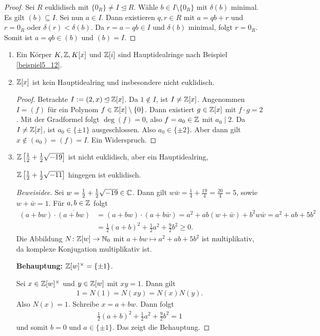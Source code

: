 \begin{proof}
	Sei $R$ euklidisch mit $\{0_R\} \neq I \unlhd R$. Wähle $b \in I \setminus \{0_R\}$ mit $\delta(b)$ minimal. Es gilt $(b) \subseteq I$. Sei nun $a \in I$. Dann existieren $q,r \in R$ mit $a = qb + r$ und $r = 0_R$ oder $\delta(r) < \delta(b)$. Da $r = a - qb \in I$ und $\delta(b)$ minimal, folgt  $r = 0_R$. Somit ist $a = qb \in (b)$ und $(b) = I$.
\end{proof}
\begin{beispiel}\label{beispiel5_15}
	\begin{enumerate}[label=(\arabic*)]
		\item Ein Körper $K, \mathbb{Z}, K[x]$ und $\mathbb{Z}[i]$ sind Hauptidealringe nach Beispiel \ref{beispiel5_12}.
		\item $\mathbb{Z}[x]$ ist kein Hauptidealring und insbesondere nicht euklidisch. 
		\begin{proof}
			Betrachte $I := (2,x) \unlhd \mathbb{Z}[x]$. Da $1 \notin I$, ist $I \neq \mathbb{Z}[x]$. Angenommen $I = (f)$ für ein Polynom $f \in \mathbb{Z}[x] \setminus \{0\}$. Dann existiert $g \in \mathbb{Z}[x]$ mit $f \cdot g = 2$. Mit der Gradformel folgt $\deg(f) = 0$, also $f = a_0 \in \mathbb{Z}$ mit $a_0 \mid 2$. Da $I \neq \mathbb{Z}[x]$, ist $a_0 \in \{\pm 1\}$ ausgeschlossen. Also $a_0 \in \{\pm 2\}$. Aber dann gilt $x \notin (a_0) = (f) = I$. Ein Widerspruch.
		\end{proof}
		\item $\mathbb{Z}\left[\frac{1}{2} + \frac{1}{2}\sqrt{-19}\right]$ ist nicht euklidisch, aber ein Hauptidealring,
		
		$\mathbb{Z}\left[\frac{1}{2} + \frac{1}{2}\sqrt{-11}\right]$ hingegen ist euklidisch.
		\begin{proof}[Beweisidee]
			Sei $w = \frac{1}{2} + \frac{1}{2}\sqrt{-19} \in \mathbb{C}$. Dann gilt $w \bar{w} = \frac{1}{4} + \frac{19}{4} = \frac{20}{4} = 5$, sowie $w + \bar{w} = 1$. Für $a,b \in \mathbb{Z}$ folgt
			\begin{align*}
				(a+bw) \cdot \overline{(a+bw)} &= (a+bw)\cdot(a+b\bar{w}) = a^2 + ab(w+\bar{w}) + b^2 w\bar{w} = a^2 + ab + 5b^2\\
				&= \frac{1}{2}(a+b)^2 + \frac{1}{2}a^2 + \frac{9}{2} b^2 \geq 0.
			\end{align*}
			Die Abbildung $N \colon \mathbb{Z}[w] \to \mathbb{N}_0$ mit $a + bw \mapsto a^2 + ab + 5b^2$ ist multiplikativ, da komplexe Konjugation multiplikativ ist. 
			
			\textbf{Behauptung: } $\mathbb{Z}[w]^\times = \{\pm 1\}$. 
			
			Sei $x \in \mathbb{Z}[w]^\times$ und $y \in \mathbb{Z}[w]$ mit $xy = 1$. Dann gilt
			\begin{align*}
				1 = N(1) = N(xy) = N(x)N(y).
			\end{align*}
			Also $N(x)= 1$. Schreibe $x = a + bw$. Dann folgt
			\begin{align*}
				\frac{1}{2}(a+b)^2 + \frac{1}{2}a^2+ \frac{9}{2}b^2 = 1
			\end{align*}
			und somit $b = 0$ und $a \in \{\pm 1\}$. Das zeigt die Behauptung. 
			

\end{proof}
\end{enumerate}
\end{beispiel}
